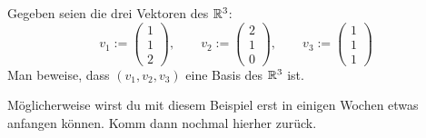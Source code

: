 \begin{aufg}
    Gegeben seien die drei Vektoren des $\mathbb R^3$:
        \[ v_1:= \begin{pmatrix} 1 \\ 1 \\ 2 \end{pmatrix},\qquad  v_2:= \begin{pmatrix} 2 \\ 1 \\ 0 \end{pmatrix},\qquad v_3:= \begin{pmatrix} 1 \\ 1 \\ 1 \end{pmatrix}\]
    Man beweise, dass $(v_1,v_2,v_3)$ eine Basis des $\mathbb R^3$ ist.
\end{aufg}


Möglicherweise wirst du mit diesem Beispiel erst in einigen Wochen etwas anfangen können. Komm dann nochmal hierher zurück.

